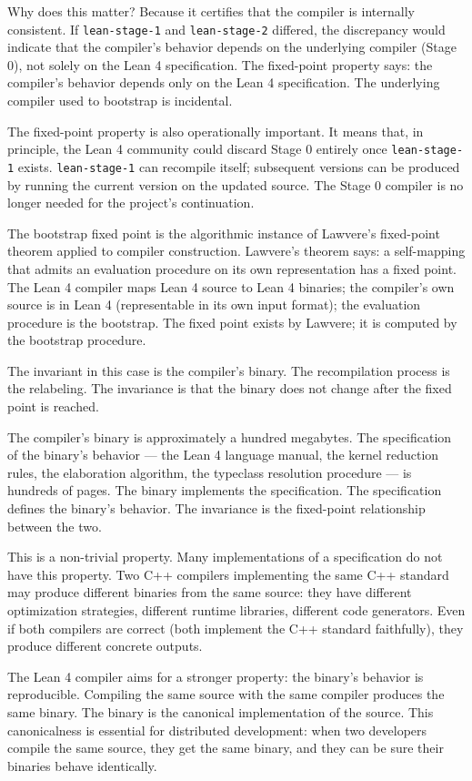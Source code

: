 Why does this matter? Because it certifies that the compiler is
internally consistent. If \texttt{lean-stage-1} and
\texttt{lean-stage-2} differed, the discrepancy would indicate that
the compiler's behavior depends on the underlying compiler (Stage
0), not solely on the Lean 4 specification. The fixed-point
property says: the compiler's behavior depends only on the Lean 4
specification. The underlying compiler used to bootstrap is
incidental.

The fixed-point property is also operationally important. It means
that, in principle, the Lean 4 community could discard Stage 0
entirely once \texttt{lean-stage-1} exists. \texttt{lean-stage-1}
can recompile itself; subsequent versions can be produced by
running the current version on the updated source. The Stage 0
compiler is no longer needed for the project's continuation.

The bootstrap fixed point is the algorithmic instance of Lawvere's
fixed-point theorem applied to compiler construction. Lawvere's
theorem says: a self-mapping that admits an evaluation procedure
on its own representation has a fixed point. The Lean 4 compiler
maps Lean 4 source to Lean 4 binaries; the compiler's own source
is in Lean 4 (representable in its own input format); the
evaluation procedure is the bootstrap. The fixed point exists by
Lawvere; it is computed by the bootstrap procedure.

The invariant in this case is the compiler's binary. The
recompilation process is the relabeling. The invariance is that
the binary does not change after the fixed point is reached.

The compiler's binary is approximately a hundred megabytes. The
specification of the binary's behavior --- the Lean 4 language
manual, the kernel reduction rules, the elaboration algorithm, the
typeclass resolution procedure --- is hundreds of pages. The
binary implements the specification. The specification defines
the binary's behavior. The invariance is the fixed-point
relationship between the two.

This is a non-trivial property. Many implementations of a
specification do not have this property. Two C++ compilers
implementing the same C++ standard may produce different binaries
from the same source: they have different optimization strategies,
different runtime libraries, different code generators. Even if
both compilers are correct (both implement the C++ standard
faithfully), they produce different concrete outputs.

The Lean 4 compiler aims for a stronger property: the binary's
behavior is reproducible. Compiling the same source with the same
compiler produces the same binary. The binary is the canonical
implementation of the source. This canonicalness is essential for
distributed development: when two developers compile the same
source, they get the same binary, and they can be sure their
binaries behave identically.

